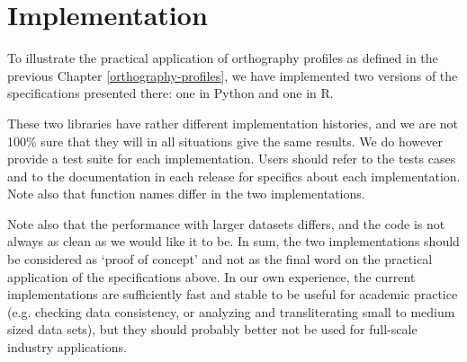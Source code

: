 \documentclass[output=inprep,
		biblatex
		]{LSP/langsci}\usepackage[]{graphicx}\usepackage[]{color}
\begin{document}
\maketitle
\frontmatter

% 
% 
\tableofcontents
\mainmatter%












\chapter{Implementation}
\label{implementation}

To illustrate the practical application of orthography profiles as defined in
the previous Chapter \ref{orthography-profiles}, we have implemented two 
versions of the specifications presented there: one in Python and one
in R.

These two libraries have rather different implementation histories,
and we are not 100\% sure that they will in all situations give the same
results. We do however provide a test suite for each implementation. 
Users should refer to the tests cases and to the documentation in each release 
for specifics about each implementation. Note also that function names differ 
in the two implementations.

Note also that the performance with larger datasets differs, and the code is not
always as clean as we would like it to be. In sum, the two implementations
should be considered as `proof of concept' and not as the final word on the
practical application of the specifications above. In our own experience, the
current implementations are sufficiently fast and stable to be useful for
academic practice (e.g. checking data consistency, or analyzing and
transliterating small to medium sized data sets), but they should probably
better not be used for full-scale industry applications.
\end{document}
